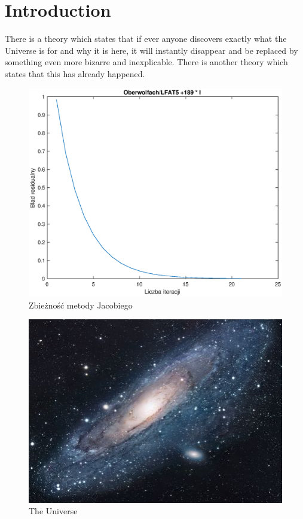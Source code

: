 \documentclass[a4paper,margin=1.54cm]{article}
\begin{document}
\section{Introduction}
There is a theory which states that if ever anyone discovers exactly what the Universe is for and why it is here, it will instantly disappear and be replaced by something even more bizarre and inexplicable.
There is another theory which states that this has already happened.

\begin{figure}[!ht]
\centering
\includegraphics[scale=0.3]{5zbiega.eps}
\caption{Zbieżność metody Jacobiego}
\label{fig:zrzut2}
\end{figure}

\begin{figure}[!ht]
\centering
\includegraphics[width=\textwidth]{universe}
\caption{The Universe}
\label{fig:universe}
\end{figure}
\end{document}
